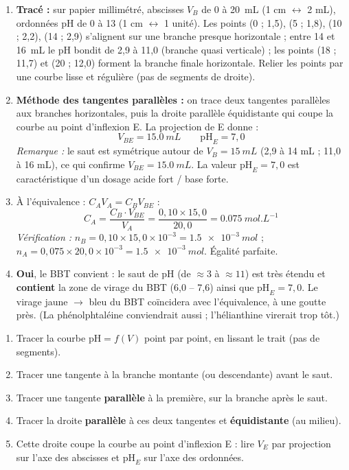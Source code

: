 \documentclass[11pt]{article}
\begin{document}
\begin{corrige}
\begin{enumerate}
\item \textbf{Tracé :} sur papier millimétré, abscisses $V_B$ de 0 à \SI{20}{mL} (1 cm $\leftrightarrow$ 2 mL), ordonnées pH de 0 à 13 (1 cm $\leftrightarrow$ 1 unité). Les points (0 ; 1,5), (5 ; 1,8), (10 ; 2,2), (14 ; 2,9) s'alignent sur une branche presque horizontale ; entre 14 et \SI{16}{mL} le pH bondit de 2,9 à 11,0 (branche quasi verticale) ; les points (18 ; 11,7) et (20 ; 12,0) forment la branche finale horizontale. Relier les points par une courbe lisse et régulière (pas de segments de droite).

\item \textbf{Méthode des tangentes parallèles :} on trace deux tangentes parallèles aux branches horizontales, puis la droite parallèle équidistante qui coupe la courbe au point d'inflexion E. La projection de E donne :
\[ V_{BE} = \SI{15,0}{mL} \qquad \mathrm{pH}_E = 7,0 \]
\emph{Remarque :} le saut est symétrique autour de $V_B = \SI{15}{mL}$ (2,9 à 14 mL ; 11,0 à 16 mL), ce qui confirme $V_{BE} = \SI{15,0}{mL}$. La valeur $\mathrm{pH}_E = 7,0$ est caractéristique d'un dosage acide fort / base forte.

\item À l'équivalence : $C_A V_A = C_B V_{BE}$ :
\[ C_A = \frac{C_B \cdot V_{BE}}{V_A} = \frac{0,10 \times 15,0}{20,0} = \SI{0,075}{mol.L^{-1}} \]
\emph{Vérification :} $n_B = 0,10 \times 15,0 \times 10^{-3} = \SI{1,5e-3}{mol}$ ; $n_A = 0,075 \times 20,0 \times 10^{-3} = \SI{1,5e-3}{mol}$. Égalité parfaite.

\item \textbf{Oui}, le BBT convient : le saut de pH (de $\approx 3$ à $\approx 11$) est très étendu et \textbf{contient} la zone de virage du BBT (6,0 -- 7,6) ainsi que $\mathrm{pH}_E = 7,0$. Le virage jaune $\to$ bleu du BBT coïncidera avec l'équivalence, à une goutte près. (La phénolphtaléine conviendrait aussi ; l'hélianthine virerait trop tôt.)
\end{enumerate}
\end{corrige}

\begin{methode}
\begin{enumerate}
\item Tracer la courbe $\mathrm{pH} = f(V)$ point par point, en lissant le trait (pas de segments).
\item Tracer une tangente à la branche montante (ou descendante) avant le saut.
\item Tracer une tangente \textbf{parallèle} à la première, sur la branche après le saut.
\item Tracer la droite \textbf{parallèle} à ces deux tangentes et \textbf{équidistante} (au milieu).
\item Cette droite coupe la courbe au point d'inflexion E : lire $V_E$ par projection sur l'axe des abscisses et $\mathrm{pH}_E$ sur l'axe des ordonnées.
\end{enumerate}
\end{methode}
\end{document}
